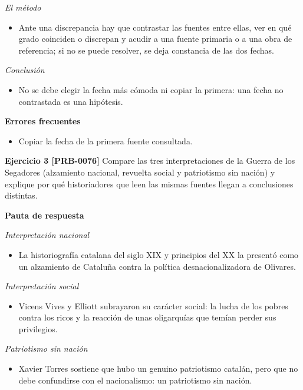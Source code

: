 \documentclass{book}
\begin{document}
\noindent\textit{El método}
\begin{itemize}
\item Ante una discrepancia hay que contrastar las fuentes entre ellas, ver en qué grado coinciden o discrepan y acudir a una fuente primaria o a una obra de referencia; si no se puede resolver, se deja constancia de las dos fechas.
\end{itemize}

\noindent\textit{Conclusión}
\begin{itemize}
\item No se debe elegir la fecha más cómoda ni copiar la primera: una fecha no contrastada es una hipótesis.
\end{itemize}

\noindent\textbf{Errores frecuentes}
\begin{itemize}
\item Copiar la fecha de la primera fuente consultada.
\end{itemize}

\noindent\textbf{Ejercicio 3 [PRB-0076]}
Compare las tres interpretaciones de la Guerra de los Segadores (alzamiento nacional, revuelta social y patriotismo sin nación) y explique por qué historiadores que leen las mismas fuentes llegan a conclusiones distintas.


\noindent\textbf{Pauta de respuesta}

\noindent\textit{Interpretación nacional}
\begin{itemize}
\item La historiografía catalana del siglo XIX y principios del XX la presentó como un alzamiento de Cataluña contra la política desnacionalizadora de Olivares.
\end{itemize}

\noindent\textit{Interpretación social}
\begin{itemize}
\item Vicens Vives y Elliott subrayaron su carácter social: la lucha de los pobres contra los ricos y la reacción de unas oligarquías que temían perder sus privilegios.
\end{itemize}

\noindent\textit{Patriotismo sin nación}
\begin{itemize}
\item Xavier Torres sostiene que hubo un genuino patriotismo catalán, pero que no debe confundirse con el nacionalismo: un patriotismo sin nación.
\end{itemize}
\end{document}
